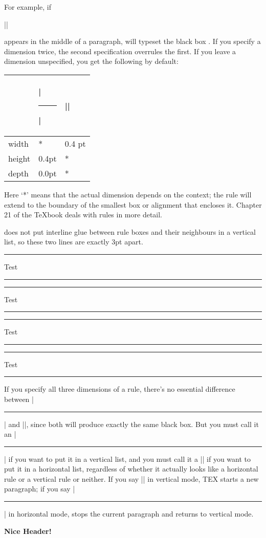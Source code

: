 \begin{teX}
\begin{teX}
\begin{teX}
\begin{teX}
\begin{teX}
\begin{teX}
For example, if

|\vrule height4pt width3pt depth2pt|

\def\smallbox{\vrule height4pt width3pt depth2pt}

\noindent appears in the middle of a paragraph, \tex will typeset the black box \smallbox. If you specify a dimension twice, the second specification overrules the first. If you leave a dimension unspecified, you get the following by default:

\begin{tabular}{lll}
\toprule
~     &|\hrule| &|\vrule|\\
\midrule
width &*        &0.4 pt\\
height&0.4pt    &*\\
depth &0.0pt    &*\\
\bottomrule
\end{tabular}
\medskip


Here `*' means that the actual dimension depends on the context; the rule will extend to the boundary of the smallest box or alignment that encloses it. Chapter 21 of the TeXbook deals with rules in more detail.

\tex does not put interline glue between rule boxes and their neighbours in a vertical list, so these two lines are exactly 3pt apart. 
\begin{teX}
\hrule width50pt Test \hrule width50pt
\vskip3pt
\hrule width50pt Test \hrule width50pt
\end{teX}

\hrule width50pt Test \hrule width50pt
\vskip3pt
\hrule width50pt Test \hrule width50pt
\medskip

If you specify all three dimensions of a rule, there's no essential difference
between |\hrule| and |\vrule|, since both will produce exactly the same black
box. But you must call it an |\hrule| if you want to put it in a vertical list, and you
must call it a |\vrule| if you want to put it in a horizontal list, regardless of whether it
actually looks like a horizontal rule or a vertical rule or neither. If you say |\vrule| in vertical mode, TEX starts a new paragraph; if you say |\hrule| in horizontal mode, \tex stops the current paragraph and returns to vertical mode.

\begin{teX}
\centerline{\vrule height 4pt width 6cm}
\medskip
\centerline{\bf Nice Header!}
\medskip
\centerline{\vrule height 4pt width 6cm}
\end{teX}


\end{teX}
\end{teX}
\end{teX}
\end{teX}
\end{teX}
\end{teX}
